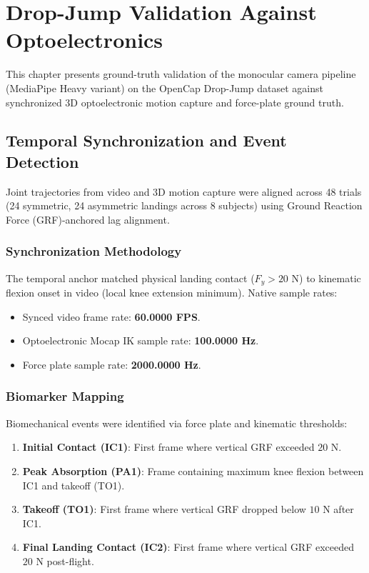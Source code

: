 \chapter{Drop-Jump Validation Against Optoelectronics}
\label{ch:dropjump}



This chapter presents ground-truth validation of the monocular camera pipeline (MediaPipe Heavy variant) on the OpenCap Drop-Jump dataset against synchronized 3D optoelectronic motion capture and force-plate ground truth.



\section{Temporal Synchronization and Event Detection}
\label{sec:6-1-temporal-synchronization-and-event-detection}


Joint trajectories from video and 3D motion capture were aligned across 48 trials (24 symmetric, 24 asymmetric landings across 8 subjects) using Ground Reaction Force (GRF)-anchored lag alignment.

\subsection{Synchronization Methodology}
\label{sec:6-1-1-synchronization-methodology}

The temporal anchor matched physical landing contact ($F_y > 20$ N) to kinematic flexion onset in video (local knee extension minimum). Native sample rates:
\begin{itemize}
  \item Synced video frame rate: \textbf{60.0000 FPS}.
  \item Optoelectronic Mocap IK sample rate: \textbf{100.0000 Hz}.
  \item Force plate sample rate: \textbf{2000.0000 Hz}.
\end{itemize}

\subsection{Biomarker Mapping}
\label{sec:6-1-2-biomarker-mapping}

Biomechanical events were identified via force plate and kinematic thresholds:
\begin{enumerate}
  \item \textbf{Initial Contact (IC1)}: First frame where vertical GRF exceeded $20$ N.
  \item \textbf{Peak Absorption (PA1)}: Frame containing maximum knee flexion between IC1 and takeoff (TO1).
  \item \textbf{Takeoff (TO1)}: First frame where vertical GRF dropped below $10$ N after IC1.
  \item \textbf{Final Landing Contact (IC2)}: First frame where vertical GRF exceeded $20$ N post-flight.
\end{enumerate}

